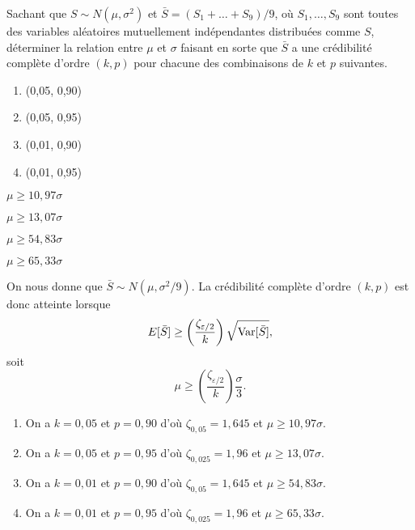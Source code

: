 \begin{exercice}
  Sachant que $S \sim N(\mu, \sigma^2)$ et $\bar{S} = (S_1 + \dots +
  S_9)/9$, où $S_1, \dots, S_9$ sont toutes des variables aléatoires
  mutuellement indépendantes distribuées comme $S$, déterminer la
  relation entre $\mu$ et $\sigma$ faisant en sorte que $\bar{S}$ a
  une crédibilité complète d'ordre $(k, p)$ pour chacune des
  combinaisons de $k$ et $p$ suivantes.
  \begin{enumerate}
  \item (0,05, 0,90)
  \item (0,05, 0,95)
  \item (0,01, 0,90)
  \item (0,01, 0,95)
  \end{enumerate}
  \begin{rep}
    \begin{inparaenum}
    \item $\mu \geq 10,97 \sigma$
    \item $\mu \geq 13,07 \sigma$
    \item $\mu \geq 54,83 \sigma$
    \item $\mu \geq 65,33 \sigma$
    \end{inparaenum}
  \end{rep}
  \begin{sol}
    On nous donne que $\bar{S} \sim N(\mu, \sigma^2/9)$. La
    crédibilité complète d'ordre $(k, p)$ est donc atteinte lorsque
    \begin{displaymath}
      E [ \bar{S} ] \geq \left( \frac{\zeta_{\varepsilon/2}}{k} \right)
      \sqrt{\operatorname{Var} [ \bar{S} ]},
    \end{displaymath}
    soit
    \begin{displaymath}
      \mu \geq \left( \frac{\zeta_{\varepsilon/2}}{k} \right)
      \frac{\sigma}{3}.
    \end{displaymath}
    \begin{enumerate}
    \item On a $k = 0,05$ et $p = 0,90$ d'où $\zeta_{0,05} = 1,645$ et
      $\mu \geq 10,97 \sigma$.
    \item On a $k = 0,05$ et $p = 0,95$ d'où $\zeta_{0,025} = 1,96$ et
      $\mu \geq 13,07 \sigma$.
    \item On a $k = 0,01$ et $p = 0,90$ d'où $\zeta_{0,05} = 1,645$ et
      $\mu \geq 54,83 \sigma$.
    \item On a $k = 0,01$ et $p = 0,95$ d'où $\zeta_{0,025} = 1,96$ et
      $\mu \geq 65,33 \sigma$.
    \end{enumerate}
  \end{sol}
\end{exercice}

